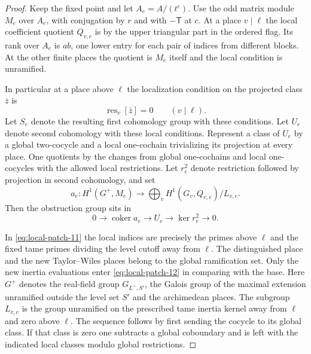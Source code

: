 \begin{proof}
Keep the fixed point and let \(A_e=A/(t^e)\).
Use the odd matrix module \(M_e\) over \(A_e\),
with conjugation by \(r\) and with \(-\mathsf T\)
at \(c\). At a place \(v\mid\ell\) the local
coefficient quotient \(Q_{v,e}\) is by the
upper triangular part in the ordered flag. Its
rank over \(A_e\) is \(ab\), one lower entry for each
pair of indices from different blocks. At the other
finite places the quotient is \(M_e\) itself and
the local condition is unramified.

In particular at a place above \(\ell\) the localization condition on the projected class \(\bar z\) is
\[
 \operatorname{res}_v[\bar z]=0\qquad(v\mid\ell).
\] Let \(S_e\)
denote the resulting first cohomology group with
these conditions. Let \(U_e\) denote second
cohomology with these local conditions.
Represent a class of \(U_e\) by a global
two-cocycle and a local one-cochain trivializing
its projection at every place. One quotients by the
changes from global one-cochains and local
one-cocycles with the allowed local restrictions.
Let \(r_e^2\) denote restriction followed by projection
in second cohomology, and set
\[
 a_e\colon H^1(G^+,M_e)\longrightarrow
             \bigoplus_v H^1(G_v,Q_{v,e})/L_{v,e}.
\]
Then the obstruction group sits in
\[
 0\longrightarrow\operatorname{coker}a_e\longrightarrow U_e
 \longrightarrow\ker r^2_e\longrightarrow0.
 \tag{11}\label{eq:local-patch-11}
\]

In \eqref{eq:local-patch-11} the local indices are precisely the primes above \(\ell\)
and the fixed tame primes dividing the level cutoff away from \(\ell\).
The distinguished place and the new Taylor--Wiles places belong to the
global ramification set. Only the new inertia evaluations enter \eqref{eq:local-patch-12}
in comparing with the base. Here \(G^+\) denotes the real-field group
\(G_{L^+,S'}\), the Galois group of the maximal extension unramified
outside the level set \(S'\) and the archimedean places. The subgroup \(L_{v,e}\) is the group unramified on the prescribed tame inertia kernel away from
\(\ell\) and zero above \(\ell\). The sequence follows
by first sending the cocycle to its global class.
If that class is zero one subtracts a global
coboundary and is left with the indicated local
classes modulo global restrictions.


\end{proof}

